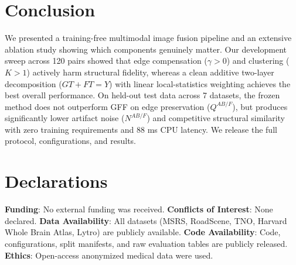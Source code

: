 \documentclass[conference]{IEEEtran}
\begin{document}
\section{Conclusion}
We presented a training-free multimodal image fusion pipeline and an extensive ablation study showing which components genuinely matter. Our development sweep across 120 pairs showed that edge compensation ($\gamma > 0$) and clustering ($K > 1$) actively harm structural fidelity, whereas a clean additive two-layer decomposition ($GT + FT = Y$) with linear local-statistics weighting achieves the best overall performance. On held-out test data across 7 datasets, the frozen method does not outperform GFF on edge preservation ($Q^{AB/F}$), but produces significantly lower artifact noise ($N^{AB/F}$) and competitive structural similarity with zero training requirements and 88 ms CPU latency. We release the full protocol, configurations, and results.

\section*{Declarations}
\textbf{Funding}: No external funding was received. \textbf{Conflicts of Interest}: None declared. \textbf{Data Availability}: All datasets (MSRS, RoadScene, TNO, Harvard Whole Brain Atlas, Lytro) are publicly available. \textbf{Code Availability}: Code, configurations, split manifests, and raw evaluation tables are publicly released. \textbf{Ethics}: Open-access anonymized medical data were used.
\end{document}
